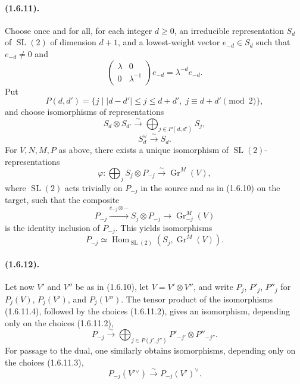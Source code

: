 \documentclass[11pt]{article}
\theoremstyle{remark}
\newcommand{\Hom}{\operatorname{Hom}}
\newcommand{\Gr}{\operatorname{Gr}}
\begin{document}
\paragraph{(1.6.11).}
Choose once and for all, for each integer $d\ge0$, an irreducible representation $S_d$ of $\operatorname{SL}(2)$ of dimension $d+1$, and a lowest-weight vector $e_{-d}\in S_d$ such that $e_{-d}\ne0$ and
\[
\begin{pmatrix}\lambda&0\\0&\lambda^{-1}\end{pmatrix}e_{-d}=\lambda^{-d}e_{-d}.
\]
Put
\begin{equation}\tag{1.6.11.1}
P(d,d')=\{j\mid |d-d'|\le j\le d+d',\; j\equiv d+d'\pmod 2\},
\end{equation}
and choose isomorphisms of representations
\begin{equation}\tag{1.6.11.2}
S_d\otimes S_{d'}\xrightarrow{\sim}\bigoplus_{j\in P(d,d')}S_j,
\end{equation}
\begin{equation}\tag{1.6.11.3}
S_d^\vee\xrightarrow{\sim}S_d.
\end{equation}
For $V,N,M,P$ as above, there exists a unique isomorphism of $\operatorname{SL}(2)$-representations
\begin{equation}\tag{1.6.11.4}
\varphi:\bigoplus_j S_j\otimes P_{-j}\xrightarrow{\sim}\Gr^M(V),
\end{equation}
where $\operatorname{SL}(2)$ acts trivially on $P_{-j}$ in the source and as in (1.6.10) on the target, such that the composite
\[
P_{-j}\xrightarrow{e_{-j}\otimes -}S_j\otimes P_{-j}\longrightarrow \Gr^M_{-j}(V)
\]
is the identity inclusion of $P_{-j}$. This yields isomorphisms
\begin{equation}\tag{1.6.11.5}
P_{-j}\simeq \Hom_{\operatorname{SL}(2)}(S_j,\Gr^M(V)).
\end{equation}

\paragraph{(1.6.12).}
Let now $V'$ and $V''$ be as in (1.6.10), let $V=V'\otimes V''$, and write $P_j$, $P'_j$, $P''_j$ for $P_j(V)$, $P_j(V')$, and $P_j(V'')$. The tensor product of the isomorphisms (1.6.11.4), followed by the choices (1.6.11.2), gives an isomorphism, depending only on the choices (1.6.11.2),
\begin{equation}\tag{1.6.12.1}
P_{-j}\xrightarrow{\sim}\bigoplus_{j\in P(j',j'')}P'_{-j'}\otimes P''_{-j''}.
\end{equation}
For passage to the dual, one similarly obtains isomorphisms, depending only on the choices (1.6.11.3),
\begin{equation}\tag{1.6.12.2}
P_{-j}(V'{}^\vee)\xrightarrow{\sim}P_{-j}(V')^\vee.
\end{equation}
\end{document}
